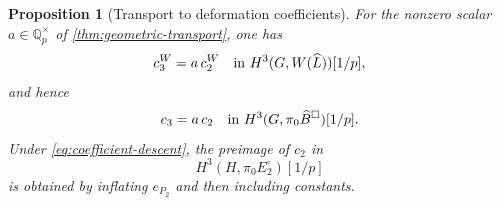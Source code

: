 \documentclass[11pt]{article}
\numberwithin{equation}{section}
\newtheorem{proposition}[theorem]{Proposition}
\theoremstyle{definition}
\theoremstyle{remark}
\begin{document}
\begin{proposition}[Transport to deformation coefficients]
\label{prop:coefficient-transport}
For the nonzero scalar $a\in\mathbb Q_p^\times$ of
\cref{thm:geometric-transport}, one has
\begin{equation}\label{eq:witt-relation}
 c_3^W=a\,c_2^W
       \quad\hbox{in }H^3(G,W(\widehat L))[1/p],
\end{equation}
and hence
\begin{equation}\label{eq:deformation-relation}
 c_3=a\,c_2
       \quad\hbox{in }H^3(G,\pi_0\widehat B^{\square})[1/p].
\end{equation}
Under \eqref{eq:coefficient-descent}, the preimage of $c_2$ in
\[
 H^3(H,\pi_0E_2^{\square})[1/p]
\]
is obtained by inflating $e_{P_2}$ and then including constants.
\end{proposition}
\end{document}
